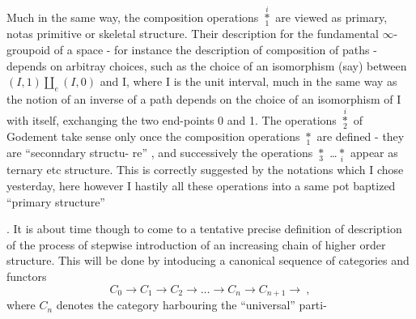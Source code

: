 Much in the same way, the composition operations $\overset{i}{\underset{1}{*}}$ are viewed as
primary, notas primitive or skeletal structure. Their description for
the fundamental $\infty$-groupoid of a space - for instance the description of
composition of paths - depends on arbitray choices, such as the choice of
an isomorphism (say) between $(I,1)\amalg_{e}(I,0)$ and I, where I is the unit
interval, much in the same way as the notion of an inverse of a path
depends on the choice of an isomorphism of I with itself, exchanging the
two end-points 0 and 1. The operations $\overset{i}{\underset{2}{*}}$ of Godement take sense only once
the composition operations $\underset{1}{*}$ are defined - they are ``seconndary structu-%
re'' , and successively the operations $\underset{3}{*}$ \ldots $\underset{i}{*}$ appear as ternary etc
structure. This is correctly suggested by the notations which I chose
yesterday, here however I hastily  all these operations into a same
pot baptized ``primary structure''\unsure{\hand{!}}

. It is about time though to come to a tentative precise definition of
description of the process of stepwise introduction of an increasing chain
of higher order structure. This will be done by intoducing a canonical
sequence of categories and functors
\[ C_{0} \to C_{1} \to C_{2} \to \ldots \to C_{n} \to C_{n+1} \to \ , \]
where $C_{n}$ denotes the  category harbouring the ``universal'' parti-%

